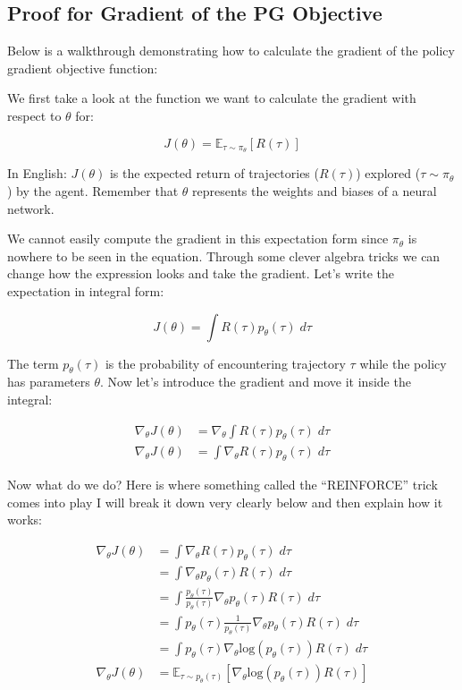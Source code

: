 \subsection{Proof for Gradient of the PG Objective}
    \large Below is a walkthrough demonstrating how to calculate the gradient of the policy gradient objective function: 

    We first take a look at the function we want to calculate the gradient with respect to $\theta$ for:

    $$J(\theta) = \mathbb{E}_{\tau \sim \pi_\theta}[R(\tau)]$$

    In English: $J(\theta)$ is the expected return of trajectories ($R(\tau)$) explored ($\tau \sim \pi_\theta$) by the agent. Remember that $\theta$ represents the weights and biases of a neural network. 
    
    We cannot easily compute the gradient in this expectation form since $\pi_\theta$ is nowhere to be seen in the equation. Through some clever algebra tricks we can change how the expression looks and take the gradient. Let's write the expectation in integral form: 

    $$J(\theta) = \int R(\tau)p_{\theta}(\tau)\;d\tau$$

    The term $p_\theta(\tau)$ is the probability of encountering trajectory $\tau$ while the policy has parameters $\theta$. Now let's introduce the gradient and move it inside the integral:

    \begin{align*}
        \nabla_\theta J(\theta) &= \nabla_\theta\int R(\tau)p_{\theta}(\tau)\;d\tau \\
        \nabla_\theta J(\theta) &= \int \nabla_\theta R(\tau)p_{\theta}(\tau)\;d\tau
    \end{align*}
    
    Now what do we do? Here is where something called the ``REINFORCE'' trick comes into play I will break it down very clearly below and then explain how it works:

    \begin{align*}
        \nabla_\theta J(\theta) &= \int \nabla_\theta R(\tau)p_{\theta}(\tau)\;d\tau \\
        &= \int \nabla_\theta p_{\theta}(\tau)R(\tau)\;d\tau \\
        &= \int \frac{p_{\theta}(\tau)}{p_{\theta}(\tau)}\nabla_\theta p_{\theta}(\tau) R(\tau)\;d\tau \\
        &= \int p_{\theta}(\tau)\frac{1}{p_{\theta}(\tau)}\nabla_\theta p_{\theta}(\tau) R(\tau)\;d\tau \\
        &= \int p_{\theta}(\tau) \nabla_\theta \mathrm{log}(p_\theta(\tau)) R(\tau)\;d\tau \\
        \nabla_\theta J(\theta) &= \mathbb{E}_{\tau \sim p_\theta(\tau)}[\nabla_\theta \mathrm{log}(p_\theta(\tau)) R(\tau)] 
    \end{align*}

